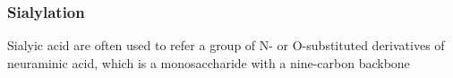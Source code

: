\subsubsection {Sialylation}
Sialyic acid are often used to refer a group of N- or O-substituted derivatives of neuraminic acid, which is a monosaccharide with a nine-carbon backbone